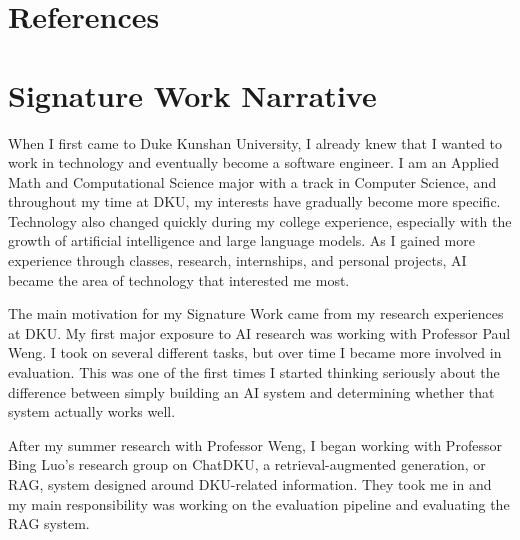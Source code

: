 \documentclass[12pt, a4paper, oneside]{report}
\newcommand{\instructions}[1]{}
\begin{document}

\chapter*{References}
\label{references}


\instructions{Many bibliographic styles are acceptable for publications in the natural sciences. This template uses a numeric style defined in biblatex and that is common in Physics, Mathematics, and Computer Science papers.}

\printbibliography[heading=none]



\chapter*{Signature Work Narrative}
\label{narrative}

When I first came to Duke Kunshan University, I already knew that I wanted to work in technology and eventually become a software engineer. I am an Applied Math and Computational Science major with a track in Computer Science, and throughout my time at DKU, my interests have gradually become more specific. Technology also changed quickly during my college experience, especially with the growth of artificial intelligence and large language models. As I gained more experience through classes, research, internships, and personal projects, AI became the area of technology that interested me most.

The main motivation for my Signature Work came from my research experiences at DKU. My first major exposure to AI research was working with Professor Paul Weng. I took on several different tasks, but over time I became more involved in evaluation. This was one of the first times I started thinking seriously about the difference between simply building an AI system and determining whether that system actually works well.

After my summer research with Professor Weng, I began working with Professor Bing Luo's research group on ChatDKU, a retrieval-augmented generation, or RAG, system designed around DKU-related information. They took me in and my main responsibility was working on the evaluation pipeline and evaluating the RAG system.
\end{document}
